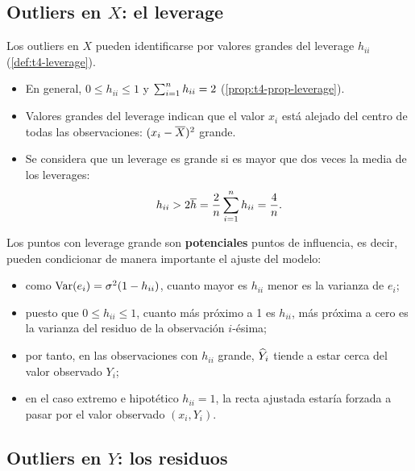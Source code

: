 \subsection{Outliers en \texorpdfstring{$X$}{X}: el leverage}
\label{sec:t4-outliers-x}

Los outliers en $X$ pueden identificarse por valores grandes del leverage $h_{ii}$
(\cref{def:t4-leverage}).
\begin{itemize}
  \item En general, $0\le h_{ii}\le1$ y $\sum_{i=1}^{n} h_{ii}=2$ (\cref{prop:t4-prop-leverage}).
  \item Valores grandes del leverage indican que el valor $x_i$ está alejado del centro de todas
    las observaciones: $(x_i-\overline{X})^2$ grande.
  \item Se considera que un leverage es grande si es mayor que dos veces la media de los
    leverages:
    \[
      h_{ii} > 2\overline{h} = \frac2n\sum_{i=1}^{n} h_{ii} = \frac4n .
    \]
\end{itemize}

Los puntos con leverage grande son \textbf{potenciales} puntos de influencia, es decir, pueden
condicionar de manera importante el ajuste del modelo:
\begin{itemize}
  \item como $\operatorname{Var}(e_i)=\sigma^2(1-h_{ii})$, cuanto mayor es $h_{ii}$ menor es la varianza de
    $e_i$;
  \item puesto que $0\le h_{ii}\le1$, cuanto más próximo a 1 es $h_{ii}$, más próxima a cero es la
    varianza del residuo de la observación $i$-ésima;
  \item por tanto, en las observaciones con $h_{ii}$ grande, $\widehat{Y}_i$ tiende a estar cerca del
    valor observado $Y_i$;
  \item en el caso extremo e hipotético $h_{ii}=1$, la recta ajustada estaría forzada a pasar por
    el valor observado $(x_i,Y_i)$.
\end{itemize}

\subsection{Outliers en \texorpdfstring{$Y$}{Y}: los residuos}
\label{sec:t4-outliers-y}

